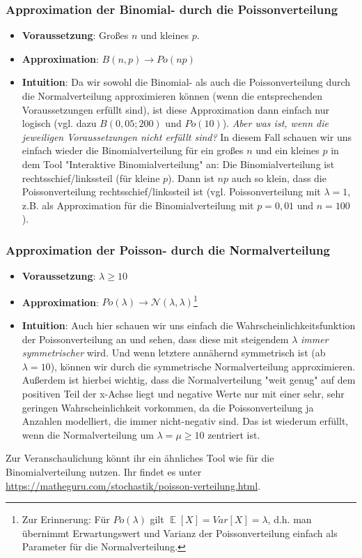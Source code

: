 \documentclass[a4paper]{article}
\DeclareMathOperator*{\E}{\mathbb{E}}
\begin{document}
\subsubsection{Approximation der Binomial- durch die Poissonverteilung}\label{sec:BinPo}
\begin{itemize}
\item[] \textbf{Voraussetzung}: Großes $n$ und kleines $p$.
\item[] \textbf{Approximation}: $B(n,p) \rightarrow Po(np)$
\item[] \textbf{Intuition}: Da wir sowohl die Binomial- als auch die Poissonverteilung durch die Normalverteilung approximieren können (wenn die entsprechenden Voraussetzungen erfüllt sind), ist diese Approximation dann einfach nur logisch (vgl. dazu $B(0,05;200)$ und $Po(10)$). \textit{Aber was ist, wenn die jeweiligen Voraussetzungen nicht erfüllt sind?} In diesem Fall schauen wir uns einfach wieder die Binomialverteilung für ein großes $n$ und ein kleines $p$ in dem Tool "Interaktive Binomialverteilung" an: 
	 Die Binomialverteilung ist rechtsschief/linkssteil (für kleine $p$). Dann ist $np$ auch so klein, dass die Poissonverteilung rechtsschief/linkssteil ist (vgl. Poissonverteilung mit $\lambda=1$, z.B. als Approximation für die Binomialverteilung mit $p=0,01$ und $n=100$).
			
\end{itemize}
\subsubsection{Approximation der Poisson- durch die Normalverteilung}\label{sec:PoN}
\begin{itemize}
\item[] \textbf{Voraussetzung}: $\lambda \geq 10$
\item[] \textbf{Approximation}: $Po(\lambda) \rightarrow \mathcal{N}(\lambda,\lambda)$\footnote{Zur Erinnerung: Für $Po(\lambda)$ gilt $\E[X]=Var[X]=\lambda$, d.h. man übernimmt Erwartungswert und Varianz der Poissonverteilung einfach als Parameter für die Normalverteilung.}
\item[] \textbf{Intuition}: Auch hier schauen wir uns einfach die Wahrscheinlichkeitsfunktion der Poissonverteilung an und sehen, dass diese mit steigendem $\lambda$ \textit{immer symmetrischer} wird. Und wenn letztere annähernd symmetrisch ist (ab $\lambda = 10$), können wir durch die symmetrische Normalverteilung approximieren. Außerdem ist hierbei wichtig, dass die Normalverteilung "weit genug" auf dem positiven Teil der x-Achse liegt und negative Werte nur mit einer sehr, sehr geringen Wahrscheinlichkeit vorkommen, da die Poissonverteilung ja Anzahlen modelliert, die immer nicht-negativ sind. Das ist wiederum erfüllt, wenn die Normalverteilung um $\lambda=\mu \geq 10$ zentriert ist.
\end{itemize}
Zur Veranschaulichung könnt ihr ein ähnliches Tool wie für die Binomialverteilung nutzen. Ihr findet es unter \url{https://matheguru.com/stochastik/poisson-verteilung.html}.
\end{document}
